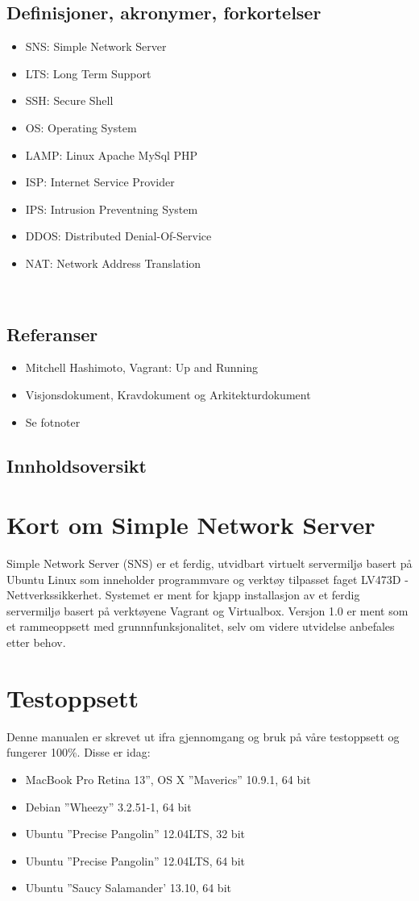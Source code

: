 \documentclass{article}
\begin{document}
\subsection{Definisjoner, akronymer, forkortelser}
\begin{itemize}
\item SNS: Simple Network Server
\item LTS: Long Term Support
\item SSH: Secure Shell
\item OS: Operating System
\item LAMP: Linux Apache MySql PHP
\item ISP: Internet Service Provider
\item IPS: Intrusion Preventning System
\item DDOS: Distributed Denial-Of-Service
\item NAT: Network Address Translation
\end{itemize}
\\
\subsection{Referanser}
\begin{itemize}
\item{Mitchell Hashimoto, Vagrant: Up and Running}
\item Visjonsdokument, Kravdokument og Arkitekturdokument
\item Se fotnoter
\end{itemize}
\subsection{Innholdsoversikt}
\section{Kort om Simple Network Server}
Simple Network Server (SNS) er et ferdig, utvidbart virtuelt servermiljø basert på Ubuntu Linux som inneholder programmvare og verktøy tilpasset faget LV473D -Nettverkssikkerhet. Systemet er ment for kjapp installasjon av et ferdig servermiljø basert på verktøyene Vagrant og Virtualbox. Versjon 1.0 er ment som et rammeoppsett med grunnnfunksjonalitet, selv om videre utvidelse anbefales etter behov.
\section{Testoppsett}
Denne manualen er skrevet ut ifra gjennomgang og bruk på våre testoppsett og fungerer 100\%. Disse er idag: 
\begin{itemize}
\item MacBook Pro Retina 13'', OS X  ''Maverics'' 10.9.1, 64 bit
\item Debian ''Wheezy'' 3.2.51-1, 64 bit
\item Ubuntu ''Precise Pangolin'' 12.04LTS, 32 bit
\item Ubuntu ''Precise Pangolin'' 12.04LTS, 64 bit
\item Ubuntu ''Saucy Salamander' 13.10, 64 bit
\end{itemize}
\end{document}
